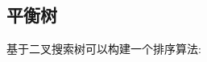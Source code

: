 \documentclass[a4paper]{ctexart}
\theoremstyle{definition}
\theoremstyle{definition}
\begin{document}








\subsection{平衡树}

基于二叉搜索树可以构建一个排序算法:
\end{document}
